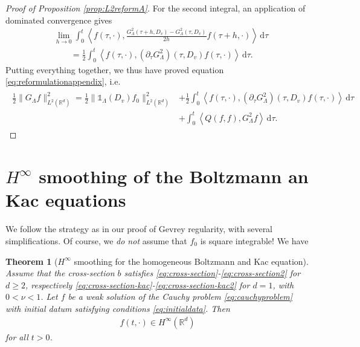 \documentclass[11pt,a4paper,reqno]{amsart}
\theoremstyle{plain}
\newtheorem{theorem}[proposition]{Theorem}
\theoremstyle{definition}
\begin{document}
\begin{proof}[Proof of Proposition \ref{prop:L2reformA}]
For the second integral, an application of dominated convergence gives
\begin{align*}
	&\lim_{h\to 0} \int_0^t \left\langle f(\tau, \cdot), \frac{G_{\Lambda}^2(\tau+h, D_v) - G_{\Lambda}^2(\tau, D_v)}{2h} f(\tau+h,\cdot) \right\rangle \,\mathrm{d}\tau \\
	&\qquad = \frac{1}{2} \int_0^t \left\langle f(\tau, \cdot), \left(\partial_{\tau}G_{\Lambda}^2\right)(\tau, D_v) f(\tau,\cdot)\right\rangle \,\mathrm{d}\tau.
\end{align*}
Putting everything together, we thus have proved equation \eqref{eq:reformulationappendix}, i.e.
\begin{align*}
\begin{split}
	\frac{1}{2} \|G_{\Lambda} f\|_{L^2({\mathbb{R}}^d)}^2 = \frac{1}{2} \|{\mathds{1}}_{\Lambda}(D_v)f_0\|_{L^2({\mathbb{R}}^d)}^2 &+ \frac{1}{2} \int_0^t \left\langle f(\tau, \cdot), \left(\partial_{\tau}G_{\Lambda}^2\right)(\tau, D_v) f(\tau,\cdot)\right\rangle \,\mathrm{d}\tau  \\ &+ \int_0^t \left\langle Q(f,f), G_{\Lambda}^2f \right\rangle \,\mathrm{d}\tau.
	\end{split}
\end{align*}
\end{proof}

\section{$H^{\infty}$ smoothing of the Boltzmann an Kac equations}\label{sec:appendix-hinfty}
We follow the strategy as in our proof of Gevrey regularity, with several simplifications. Of course, we \emph{do not} assume that $f_0$ is square integrable! We have
\begin{theorem}[$H^\infty$ smoothing for the homogeneous Boltzmann and Kac equation]\label{thm:Hinftysmoothing}
	Assume that the cross-section $b$ satisfies \eqref{eq:cross-section}-\eqref{eq:cross-section2} for $d\geq 2$, respectively \eqref{eq:cross-section-kac}-\eqref{eq:cross-section-kac2} for $d=1$, with $0<\nu<1$. Let $f$ be a weak solution of the Cauchy problem \eqref{eq:cauchyproblem} with initial datum satisfying conditions \eqref{eq:initialdata}. Then
	\begin{align}
		f(t,\cdot)\in H^\infty({\mathbb{R}}^d)
	\end{align}
	for all $t>0$.
\end{theorem}
\end{document}
